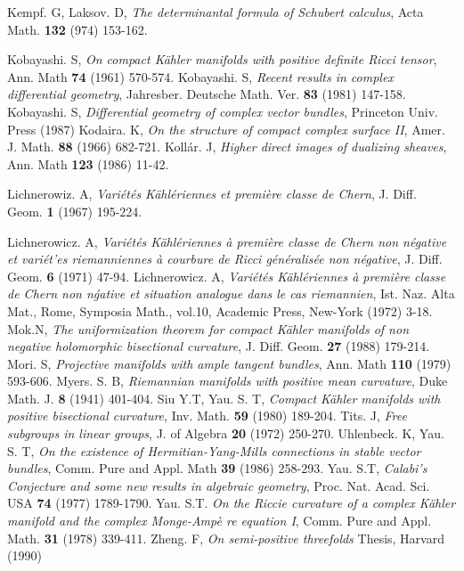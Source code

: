 \begin{thebibliography}{99}
  Kempf. G, Laksov. D, \textit{The determinantal formula of Schubert calculus}, Acta Math. {\bf 132} (974) 153-162.
 
  Kobayashi. S, \textit{On compact K\"ahler manifolds with positive definite Ricci tensor}, Ann. Math {\bf 74} (1961) 570-574.
  Kobayashi. S, \textit{Recent results in complex differential geometry}, Jahresber. Deutsche Math. Ver. {\bf 83} (1981) 147-158.
  Kobayashi. S, \textit{Differential geometry of complex vector bundles}, Princeton Univ. Press (1987)
 Kodaira. K, \textit{On the structure of compact complex surface II}, Amer. J. Math. {\bf 88} (1966) 682-721.
  Koll\'ar. J, \textit{Higher direct images of dualizing sheaves}, Ann. Math {\bf 123} (1986) 11-42.
 
 Lichnerowiz. A, \textit{Vari\'et\'es K\"ahl\'eriennes et premi\`ere classe de Chern}, J. Diff. Geom. {\bf 1} (1967) 195-224.
 
  Lichnerowicz. A, \textit{Vari\'et\'es K\"ahl\'eriennes \`a premi\`ere classe de Chern non n\'egative et vari\'et'es riemanniennes \`a courbure de Ricci g\'en\'eralis\'ee non n\'egative}, J. Diff. Geom. {\bf 6} (1971) 47-94.
  Lichnerowicz. A, \textit{Vari\'et\'es K\"ahl\'eriennes \`a premi\`ere classe de Chern non n\'gative et situation analogue dans le cas riemannien}, Ist. Naz. Alta Mat., Rome, Symposia Math., vol.10, Academic Press, New-York (1972) 3-18.
  Mok.\pageoriginale N, \textit{The uniformization theorem for compact K\"ahler manifolds of non negative holomorphic bisectional curvature}, J. Diff. Geom. {\bf 27} (1988) 179-214.
  Mori. S, \textit{Projective manifolds with ample tangent bundles}, Ann. Math {\bf 110} (1979) 593-606.
  Myers. S. B, \textit{Riemannian manifolds with positive mean curvature}, Duke Math. J. {\bf 8} (1941) 401-404.
  Siu Y.T, Yau. S. T, \textit{Compact K\"ahler manifolds with positive bisectional curvature}, Inv. Math. {\bf 59} (1980) 189-204.
   Tits. J, \textit{Free subgroups in linear groups}, J. of Algebra {\bf 20} (1972) 250-270.
  Uhlenbeck. K, Yau. S. T, \textit{On the existence of Hermitian-Yang-Mills connections in stable vector bundles}, Comm. Pure and Appl. Math {\bf 39} (1986) 258-293.
  Yau. S.T, \textit{Calabi's Conjecture and some new results in algebraic geometry}, Proc. Nat. Acad. Sci. USA {\bf 74} (1977) 1789-1790.
  Yau. S.T. \textit{On the Riccie curvature of a complex K\"ahler manifold and the complex Monge-Amp\`e re equation I}, Comm. Pure and Appl. Math. {\bf 31} (1978) 339-411.
  Zheng. F, \textit{On semi-positive threefolds} Thesis, Harvard (1990)
\end{thebibliography}


